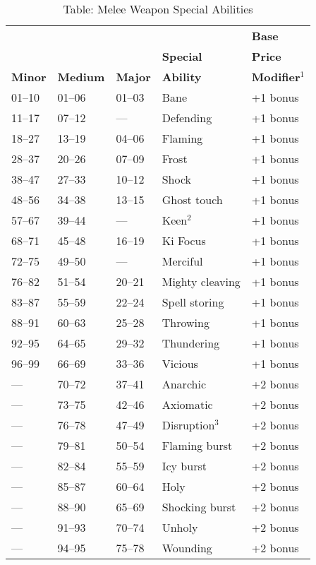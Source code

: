 \begin{table}[]
\sffamily
\caption{Table: Melee Weapon Special Abilities}
\setlength{\tabcolsep}{1pt}
\begin{tabular}{lllll}
               &                 &                &                  & \textbf{Base} \\
               &                 &                & \textbf{Special} & \textbf{Price} \\
\textbf{Minor} & \textbf{Medium} & \textbf{Major} & \textbf{Ability} & \textbf{Modifier\(^{1}\)}\\
01--10 & 01--06 & 01--03 & Bane & +1 bonus\\
11--17 & 07--12 & --- & Defending & +1 bonus\\
18--27 & 13--19 & 04--06 & Flaming & +1 bonus\\
28--37 & 20--26 & 07--09 & Frost & +1 bonus\\
38--47 & 27--33 & 10--12 & Shock & +1 bonus\\
48--56 & 34--38 & 13--15 & Ghost touch & +1 bonus\\
57--67 & 39--44 & --- & Keen\(^{2}\) & +1 bonus\\
68--71 & 45--48 & 16--19 & Ki Focus & +1 bonus\\
72--75 & 49--50 & --- & Merciful & +1 bonus\\
76--82 & 51--54 & 20--21 & Mighty cleaving & +1 bonus\\
83--87 & 55--59 & 22--24 & Spell storing & +1 bonus\\
88--91 & 60--63 & 25--28 & Throwing & +1 bonus\\
92--95 & 64--65 & 29--32 & Thundering & +1 bonus\\
96--99 & 66--69 & 33--36 & Vicious & +1 bonus\\
--- & 70--72 & 37--41 & Anarchic & +2 bonus\\
--- & 73--75 & 42--46 & Axiomatic & +2 bonus\\
--- & 76--78 & 47--49 & Disruption\(^{3}\) & +2 bonus\\
--- & 79--81 & 50--54 & Flaming burst & +2 bonus\\
--- & 82--84 & 55--59 & Icy burst & +2 bonus\\
--- & 85--87 & 60--64 & Holy & +2 bonus\\
--- & 88--90 & 65--69 & Shocking burst & +2 bonus\\
--- & 91--93 & 70--74 & Unholy & +2 bonus\\
--- & 94--95 & 75--78 & Wounding & +2 bonus\\

\end{tabular}
\end{table}
